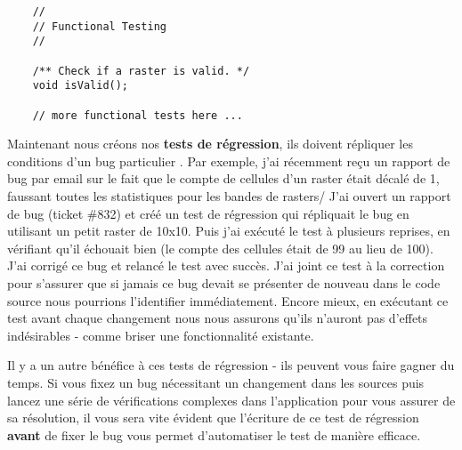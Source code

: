 \begin{verbatim}
    //
    // Functional Testing
    //
    
    /** Check if a raster is valid. */
    void isValid();

    // more functional tests here ...
\end{verbatim}

Maintenant nous cr\'eons nos \textbf{tests de r\'egression}, ils doivent r\'epliquer les conditions d'un bug particulier . Par exemple, j'ai r\'ecemment re\c{c}u un rapport de bug par email sur le fait que le compte de cellules d'un raster \'etait d\'ecal\'e de 1, faussant toutes les statistiques pour les bandes de rasters/ J'ai ouvert un rapport de bug (ticket \#832) et cr\'e\'e un test de r\'egression qui r\'epliquait le bug en utilisant un petit raster de 10x10. Puis j'ai ex\'ecut\'e le test \`a plusieurs reprises, en v\'erifiant qu'il \'echouait bien (le compte des cellules \'etait de 99 au lieu de 100). J'ai corrig\'e ce bug et relanc\'e le test avec succ\`es. J'ai joint ce test \`a la correction pour s'assurer que si jamais ce bug devait se pr\'esenter de nouveau dans le code source nous pourrions l'identifier imm\'ediatement. Encore mieux, en ex\'ecutant ce test avant chaque changement nous nous assurons qu'ils n'auront pas d'effets ind\'esirables - comme briser une fonctionnalit\'e existante.

Il y a un autre b\'en\'efice \`a  ces tests de r\'egression - ils peuvent vous faire gagner du temps. Si vous fixez un bug n\'ecessitant un changement dans les sources puis lancez une s\'erie de v\'erifications complexes dans l'application pour vous assurer de sa r\'esolution, il vous sera vite \'evident que l'\'ecriture de ce test de r\'egression \textbf{avant} de fixer le bug vous permet d'automatiser le test de mani\`ere efficace.

